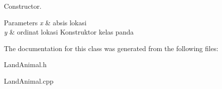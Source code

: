 Constructor. 


\begin{DoxyParams}{Parameters}
{\em x} & absis lokasi \\
\hline
{\em y} & ordinat lokasi Konstruktor kelas panda \\
\hline
\end{DoxyParams}


The documentation for this class was generated from the following files\+:\begin{DoxyCompactItemize}
\item 
Land\+Animal.\+h\item 
Land\+Animal.\+cpp\end{DoxyCompactItemize}

